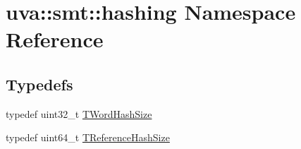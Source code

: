 \hypertarget{namespaceuva_1_1smt_1_1hashing}{}\section{uva\+:\+:smt\+:\+:hashing Namespace Reference}
\label{namespaceuva_1_1smt_1_1hashing}
\subsection*{Typedefs}
\begin{DoxyCompactItemize}
\item 
typedef uint32\+\_\+t \hyperlink{namespaceuva_1_1smt_1_1hashing_acdc1f2765e669283f8e9c1ed42705314}{T\+Word\+Hash\+Size}
\item 
typedef uint64\+\_\+t \hyperlink{namespaceuva_1_1smt_1_1hashing_a6cc10b288b11b76c718a898b022fbdd1}{T\+Reference\+Hash\+Size}
\end{DoxyCompactItemize}
